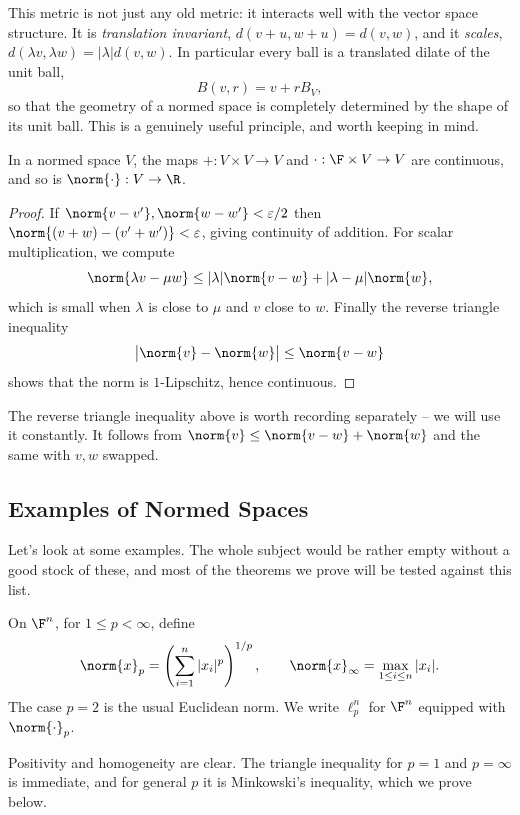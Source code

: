 This metric is not just any old metric: it interacts well with the vector space structure. It is \emph{translation invariant}, $d(v + u, w + u) = d(v,w)$, and it \emph{scales}, $d(\lambda v, \lambda w) = |\lambda| d(v,w)$. In particular every ball is a translated dilate of the unit ball,
$$B(v, r) = v + rB_V,$$
so that the geometry of a normed space is completely determined by the shape of its unit ball. This is a genuinely useful principle, and worth keeping in mind.

\begin{proposition}
	In a normed space $V$, the maps $+ : V \times V \to V$ and $\cdot : \F \times V \to V$ are continuous, and so is $\norm{\cdot} : V \to \R$.
\end{proposition}

\begin{proof}
	If $\norm{v - v'}, \norm{w - w'} < \varepsilon/2$ then $\norm{(v + w) - (v' + w')} < \varepsilon$, giving continuity of addition. For scalar multiplication, we compute
	$$\norm{\lambda v - \mu w} \leq |\lambda| \norm{v - w} + |\lambda - \mu| \norm{w},$$
	which is small when $\lambda$ is close to $\mu$ and $v$ close to $w$. Finally the reverse triangle inequality
	$$\big| \norm{v} - \norm{w} \big| \leq \norm{v - w}$$
	shows that the norm is $1$-Lipschitz, hence continuous.
\end{proof}

The reverse triangle inequality above is worth recording separately -- we will use it constantly. It follows from $\norm{v} \leq \norm{v - w} + \norm{w}$ and the same with $v, w$ swapped.

\subsection{Examples of Normed Spaces}

Let's look at some examples. The whole subject would be rather empty without a good stock of these, and most of the theorems we prove will be tested against this list.

\begin{example}
	On $\F^n$, for $1 \leq p < \infty$, define
	$$\norm{x}_p = \left( \sum_{i=1}^n |x_i|^p \right)^{1/p}, \qquad \norm{x}_\infty = \max_{1 \leq i \leq n} |x_i|.$$
	The case $p = 2$ is the usual Euclidean norm. We write $\ell_p^n$ for $\F^n$ equipped with $\norm{\cdot}_p$.

	Positivity and homogeneity are clear. The triangle inequality for $p = 1$ and $p = \infty$ is immediate, and for general $p$ it is Minkowski's inequality, which we prove below.
\end{example}

